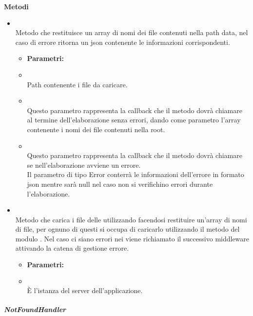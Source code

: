 		\textbf{Metodi} 
	\begin{itemize}
					\item[] \textbf{} \\ Metodo che restituisce un array di nomi dei file contenuti nella path  data, nel caso di errore ritorna un json contenente le informazioni corrispondenti.
						\begin{itemize}\addtolength{\itemsep}{-0.5\baselineskip}
						\item[] \textbf{Parametri:}
						\item[]  \\ Path contenente i file  da caricare.	
						\item[]  \\ Questo parametro rappresenta la callback che il metodo dovrà chiamare al termine dell'elaborazione senza errori, dando come parametro l'array contenente i nomi dei file contenuti nella root.	
						\item[]  \\ Questo parametro rappresenta la callback che il metodo dovrà chiamare se nell'elaborazione avviene un errore. \\ Il parametro di tipo Error conterrà le informazioni dell'errore in formato json mentre sarà null nel caso non si verifichino errori durante l'elaborazione.	
				\end{itemize}
					\item[] \textbf{} \\ Metodo che carica i file  delle  utilizzando  facendosi restituire un'array di nomi di file, per ognuno di questi si occupa di caricarlo utilizzando il metodo  del modulo . Nel caso ci siano errori nei  viene richiamato il successivo middleware attivando la catena di gestione errore.
						\begin{itemize}\addtolength{\itemsep}{-0.5\baselineskip}
						\item[] \textbf{Parametri:}
						\item[]  \\ È l'istanza del server dell'applicazione.	
				\end{itemize}
		\end{itemize}
			\subparagraph{NotFoundHandler} 

